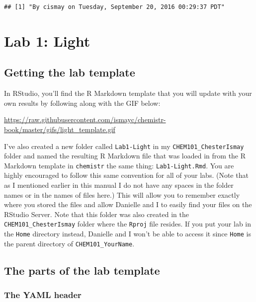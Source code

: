 \documentclass[]{tufte-book}
\begin{document}
\begin{verbatim}
## [1] "By cismay on Tuesday, September 20, 2016 00:29:37 PDT"
\end{verbatim}

\chapter{Lab 1: Light}\label{light}

\hypertarget{getting-the-lab-template}{\section{Getting the lab
template}\label{getting-the-lab-template}}

In RStudio, you'll find the R Markdown template that you will update
with your own results by following along with the GIF below:

\vspace{0.1in}

\begin{center}\footnotesize{\url{https://raw.githubusercontent.com/ismayc/chemistr-book/master/gifs/light_template.gif}}\end{center}

\vspace{0.1in}

I've also created a new folder called \texttt{Lab1-Light} in my
\texttt{CHEM101\_ChesterIsmay} folder and named the resulting R Markdown
file that was loaded in from the R Markdown template in
\texttt{chemistr} the same thing: \texttt{Lab1-Light.Rmd}. You are
highly encouraged to follow this same convention for all of your labs.
(Note that as I mentioned earlier in this manual I do not have any
spaces in the folder names or in the names of files here.) This will
allow you to remember exactly where you stored the files and allow
Danielle and I to easily find your files on the RStudio Server. Note
that this folder was also created in the \texttt{CHEM101\_ChesterIsmay}
folder where the \texttt{Rproj} file resides. If you put your lab in the
\texttt{Home} directory instead, Danielle and I won't be able to access
it since \texttt{Home} is the parent directory of
\texttt{CHEM101\_YourName}.

\section{The parts of the lab
template}\label{the-parts-of-the-lab-template}

\hypertarget{the-yaml-header}{\subsection{The YAML
header}\label{the-yaml-header}}
\end{document}
